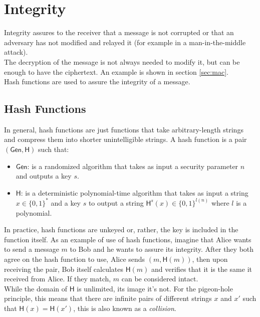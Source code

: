 \section{Integrity}
Integrity assures to the receiver that a message is not corrupted or that an adversary has not modified and relayed it (for example in a man-in-the-middle attack).\\
The decryption of the message is not always needed to modify it, but can be enough to have the ciphertext. An example is shown in section \ref{sec:mac}.\\
Hash functions are used to assure the integrity of a message.

\begin{nopbreak}
    \subsection{Hash Functions}
    In general, hash functions are just functions that take arbitrary-length strings and compress them into shorter unintelligible strings.
    A hash function is a pair $(\mathsf{Gen}, \mathsf{H})$ such that:
    \begin{itemize}
        \item{$\mathsf{Gen}$: is a randomized algorithm that takes as input a security parameter $n$ and outputs a key $s$.}
        \item{$\mathsf{H}$: is a deterministic polynomial-time algorithm that takes as input a string $x \in \{0,1\}^*$ and a key $s$ to output a string $\mathsf{H}^s(x) \in \{0,1\}^{\mathit{l}(n)}$ where $\mathit{l}$ is a polynomial.}
    \end{itemize}
\end{nopbreak}
In practice, hash functions are unkeyed or, rather, the key is included in the function itself.
    As an example of use of hash functions, imagine that Alice wants to send a message $m$ to Bob and he wants to assure its integrity. After they both agree on the hash function to use, Alice sends $(m, \mathsf{H}(m))$, then upon receiving the pair, Bob itself calculates $\mathsf{H}(m)$ and verifies that it is the same it received from Alice. If they match, $m$ can be considered intact.\\
    While the domain of $\mathsf{H}$ is unlimited, its image it's not. For the pigeon-hole principle, this means that there are infinite pairs of different strings $x$ and $x'$ such that $\mathsf{H}(x) = \mathsf{H}(x')$, this is also known as a \emph{collision}.

